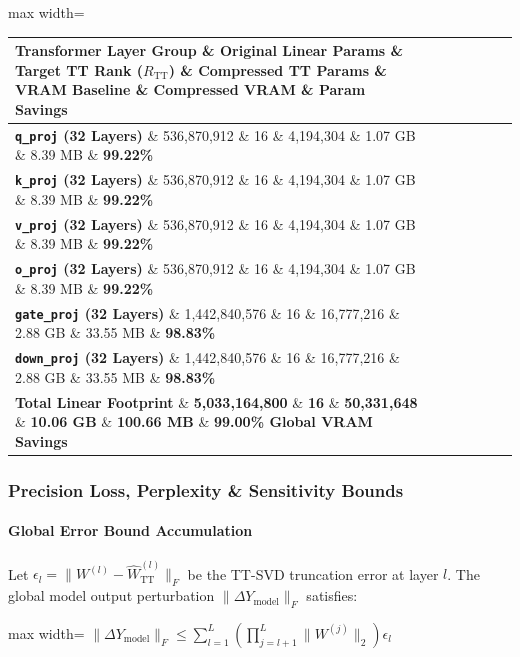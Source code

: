 \begin{center}
\begin{adjustbox}{max width=\columnwidth}
\renewcommand{\arraystretch}{1.2}
\begin{tabular}{lllllll}
\toprule
Transformer Layer Group \& Original Linear Params \& Target TT Rank ($R_{\text{TT}}$) \& Compressed TT Params \& VRAM Baseline \& Compressed VRAM \& Param Savings \\
\midrule
\textbf{\texttt{q\_proj} (32 Layers)} \& 536,870,912 \& 16 \& 4,194,304 \& 1.07 GB \& 8.39 MB \& \textbf{99.22\%} \\
\textbf{\texttt{k\_proj} (32 Layers)} \& 536,870,912 \& 16 \& 4,194,304 \& 1.07 GB \& 8.39 MB \& \textbf{99.22\%} \\
\textbf{\texttt{v\_proj} (32 Layers)} \& 536,870,912 \& 16 \& 4,194,304 \& 1.07 GB \& 8.39 MB \& \textbf{99.22\%} \\
\textbf{\texttt{o\_proj} (32 Layers)} \& 536,870,912 \& 16 \& 4,194,304 \& 1.07 GB \& 8.39 MB \& \textbf{99.22\%} \\
\textbf{\texttt{gate\_proj} (32 Layers)} \& 1,442,840,576 \& 16 \& 16,777,216 \& 2.88 GB \& 33.55 MB \& \textbf{98.83\%} \\
\textbf{\texttt{down\_proj} (32 Layers)} \& 1,442,840,576 \& 16 \& 16,777,216 \& 2.88 GB \& 33.55 MB \& \textbf{98.83\%} \\
\textbf{Total Linear Footprint} \& \textbf{5,033,164,800} \& \textbf{16} \& \textbf{50,331,648} \& \textbf{10.06 GB} \& \textbf{100.66 MB} \& \textbf{99.00\% Global VRAM Savings} \\

\bottomrule
\end{tabular}
\end{adjustbox}
\end{center}

\subsubsection*{Precision Loss, Perplexity \& Sensitivity Bounds}

\paragraph{Global Error Bound Accumulation}
Let $\epsilon_l = \|W^{(l)} - \hat{W}_{\text{TT}}^{(l)}\|_F$ be the TT-SVD truncation error at layer $l$. The global model output perturbation $\|\Delta Y_{\text{model}}\|_F$ satisfies:

\begin{center}
\begin{adjustbox}{max width=\columnwidth}
$\displaystyle
\|\Delta Y_{\text{model}}\|_F \le \sum_{l=1}^{L} \left( \prod_{j=l+1}^{L} \|W^{(j)}\|_2 \right) \epsilon_l
$
\end{adjustbox}
\end{center}


